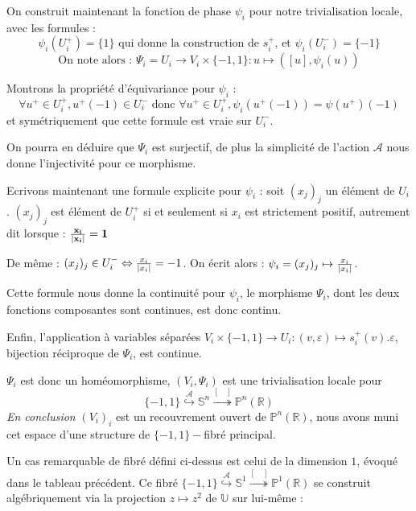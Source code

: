 \begin{exem}
\par
On construit maintenant la fonction de phase $\psi_i$ pour notre trivialisation locale, avec les formules :
\[\psi_i(U_i^+) = \{1\}\text{ qui donne la construction de $s_i^+$, et }\psi_i(U_i^-) = \{ -1 \}\]
\[\text{On note alors : }\Psi_i = U_i \rightarrow V_i \times \{ -1 , 1 \} : u \mapsto ([u],\psi_i(u))\]

Montrons la propriété d'équivariance pour $\psi_i$ :
\[\forall u^+ \in U_i^+ , u^+ (-1) \in U_i^-\text{ donc }\forall u^+ \in U_i^+ , \psi_i (u^+ (-1)) = \psi(u^+)(-1)\]
et symétriquement que cette formule est vraie sur $U_i^-$.

\par
On pourra en d\'eduire que $\Psi_i$ est surjectif, de plus la simplicité de l'action $\mathcal{A}$ nous donne l'injectivité pour ce morphisme.

\par
Ecrivons maintenant une formule explicite pour $\psi_i$  : soit $(x_j)_j$ un \'el\'ement de $U_i$. $(x_j)_j$ est élément de $U_i^+$ si et seulement si $x_i$ est strictement positif, %
autrement dit lorsque : $\mathbf{\frac{x_i}{\lvert x_i\rvert} = 1}$

\par
De m\^eme : $(x_j)_j \in U_i^- \Leftrightarrow \frac{x_i}{\lvert x_i\rvert} = -1$. %
On écrit alors : $\psi_i = (x_j)_j \mapsto \frac{x_i}{\lvert x_i\rvert}$.

\par
Cette formule nous donne la continuit\'e pour $\psi_i$, le morphisme $\Psi_i$, dont les deux fonctions composantes sont continues, est donc continu.

\par
Enfin, l'application à variables s\'epar\'ees $V_i \times \{-1 , 1\} \rightarrow U_i : (v,\varepsilon) \mapsto s_i^+(v).\varepsilon$, %
bijection réciproque de $\Psi_i$, est continue.

\par
$\Psi_i$ est donc un hom\'eomorphisme, $(V_i,\Psi_i)$ est une trivialisation locale pour
\[\{-1,1\} \overset{\mathcal{A}}{\hookrightarrow} \mathbb{S}^n \overset{[\quad]}{\twoheadrightarrow} \mathbb{P}^n(\mathbb{R})\]
%
\emph{En conclusion} $(V_i)_i$ est un recouvrement ouvert de $\mathbb{P}^n(\mathbb{R})$, nous avons muni cet espace d'une structure de $\{-1,1\}-$fibr\'e principal.
\end{exem}

Un cas remarquable de fibr\'e d\'efini ci-dessus est celui de la dimension $1$, \'evoqu\'e dans le tableau pr\'ec\'edent. %
Ce fibr\'e $\{-1,1\} \overset{\mathcal{A}}{\hookrightarrow} \mathbb{S}^1 \overset{[\quad]}{\twoheadrightarrow} \mathbb{P}^1(\mathbb{R})$ %
se construit alg\'ebriquement via la projection $z\mapsto z^2$ de $\mathbb{U}$ sur lui-m\^eme :

